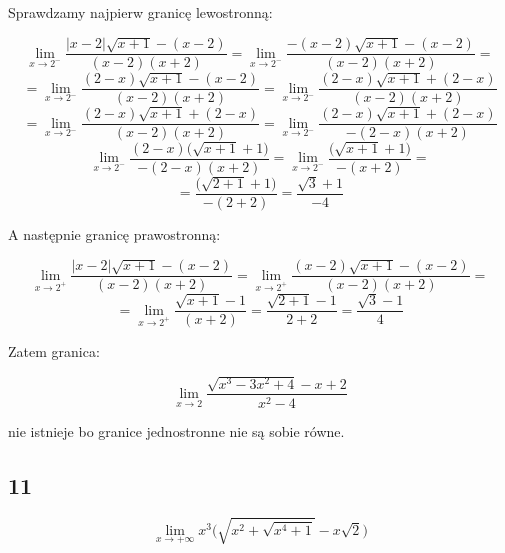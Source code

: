 \documentclass{article}
\begin{document}
Sprawdzamy najpierw granicę lewostronną:

\begin{equation*}
    \lim_{x \to 2^-} \frac{|x-2|\sqrt{x+1} - (x - 2)}{(x -2)(x+2)} = \lim_{x \to 2^-} \frac{-(x - 2)\sqrt{x+1} - (x - 2)}{(x -2)(x+2)} = 
\end{equation*}
\begin{equation*}
    = \lim_{x \to 2^-} \frac{(2 - x)\sqrt{x+1} - (x - 2)}{(x -2)(x+2)} = \lim_{x \to 2^-} \frac{(2 - x)\sqrt{x+1} + (2 - x)}{(x -2)(x+2)}
\end{equation*}
\begin{equation*}
    = \lim_{x \to 2^-} \frac{(2 - x)\sqrt{x+1} + (2 - x)}{(x -2)(x+2)} = \lim_{x \to 2^-} \frac{(2 - x)\sqrt{x+1} + (2 - x)}{-(2 - x)(x+2)}
\end{equation*}
\begin{equation*}
    \lim_{x \to 2^-} \frac{(2 - x)\Big(\sqrt{x+1} + 1 \Big)}{-(2 - x)(x+2)} = \lim_{x \to 2^-} \frac{\Big(\sqrt{x+1} + 1 \Big)}{-(x+2)} = 
\end{equation*}
\begin{equation*}
    = \frac{\Big(\sqrt{2+1} + 1 \Big)}{-(2+2)} = \frac{\sqrt{3} + 1}{-4}
\end{equation*}

A następnie granicę prawostronną:

\begin{equation*}
    \lim_{x \to 2^+} \frac{|x-2|\sqrt{x+1} - (x - 2)}{(x -2)(x+2)} = \lim_{x \to 2^+} \frac{(x-2)\sqrt{x+1} - (x - 2)}{(x -2)(x+2)} = 
\end{equation*}
\begin{equation*}
    = \lim_{x \to 2^+} \frac{\sqrt{x+1} - 1}{(x + 2)} = \frac{\sqrt{2 + 1} -1}{2 + 2} = \frac{\sqrt{3} - 1}{4}
\end{equation*}

Zatem granica:

\begin{equation*}
    \lim_{x \to 2} \frac{\sqrt{x^3 - 3x^2 +4} -x + 2}{x^2 - 4} 
\end{equation*}

nie istnieje bo granice jednostronne nie są sobie równe.

\subsection*{11}

\begin{equation*}
    \lim_{x \to + \infty} x^{3}\Bigg(\sqrt{x^{2} + \sqrt{x^{4} + 1}} - x\sqrt{2}\Bigg)    
\end{equation*}
\end{document}
